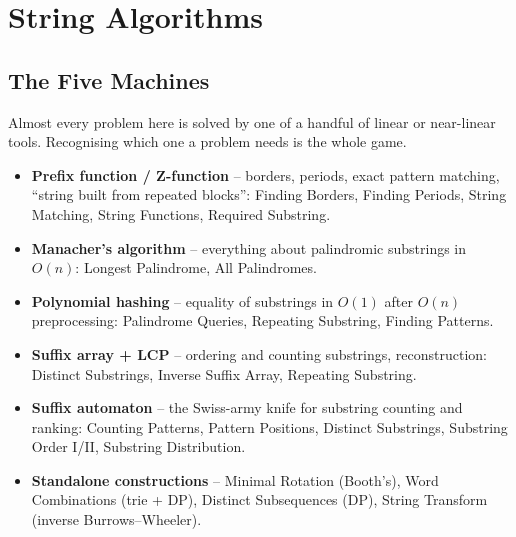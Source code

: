 \chapter{String Algorithms}

\section{The Five Machines}
\label{sec:cses-strings-intro}

Almost every problem here is solved by one of a handful of linear or
near-linear tools. Recognising which one a problem needs is the whole
game.

\begin{patternbox}
\begin{itemize}
  \item \textbf{Prefix function / Z-function} -- borders, periods, exact
        pattern matching, ``string built from repeated blocks'': Finding
        Borders, Finding Periods, String Matching, String Functions,
        Required Substring.
  \item \textbf{Manacher's algorithm} -- everything about palindromic
        substrings in $O(n)$: Longest Palindrome, All Palindromes.
  \item \textbf{Polynomial hashing} -- equality of substrings in $O(1)$
        after $O(n)$ preprocessing: Palindrome Queries, Repeating
        Substring, Finding Patterns.
  \item \textbf{Suffix array + LCP} -- ordering and counting substrings,
        reconstruction: Distinct Substrings, Inverse Suffix Array,
        Repeating Substring.
  \item \textbf{Suffix automaton} -- the Swiss-army knife for substring
        counting and ranking: Counting Patterns, Pattern Positions,
        Distinct Substrings, Substring Order I/II, Substring Distribution.
  \item \textbf{Standalone constructions} -- Minimal Rotation (Booth's),
        Word Combinations (trie + DP), Distinct Subsequences (DP), String
        Transform (inverse Burrows--Wheeler).
\end{itemize}
\end{patternbox}

